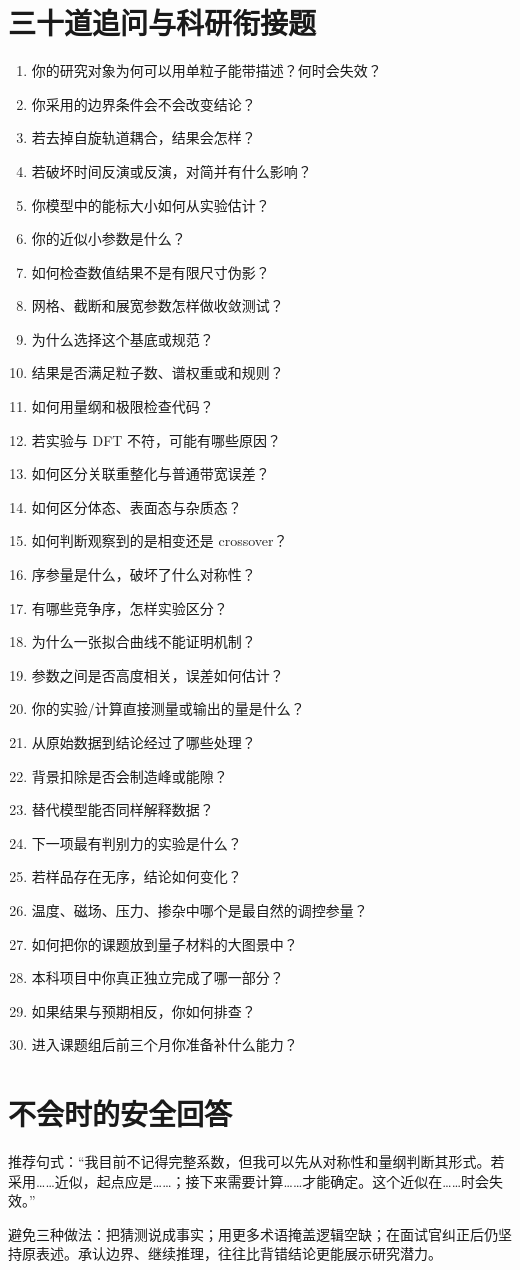 \section{三十道追问与科研衔接题}
\begin{enumerate}
\item 你的研究对象为何可以用单粒子能带描述？何时会失效？
\item 你采用的边界条件会不会改变结论？
\item 若去掉自旋轨道耦合，结果会怎样？
\item 若破坏时间反演或反演，对简并有什么影响？
\item 你模型中的能标大小如何从实验估计？
\item 你的近似小参数是什么？
\item 如何检查数值结果不是有限尺寸伪影？
\item 网格、截断和展宽参数怎样做收敛测试？
\item 为什么选择这个基底或规范？
\item 结果是否满足粒子数、谱权重或和规则？
\item 如何用量纲和极限检查代码？
\item 若实验与 DFT 不符，可能有哪些原因？
\item 如何区分关联重整化与普通带宽误差？
\item 如何区分体态、表面态与杂质态？
\item 如何判断观察到的是相变还是 crossover？
\item 序参量是什么，破坏了什么对称性？
\item 有哪些竞争序，怎样实验区分？
\item 为什么一张拟合曲线不能证明机制？
\item 参数之间是否高度相关，误差如何估计？
\item 你的实验/计算直接测量或输出的量是什么？
\item 从原始数据到结论经过了哪些处理？
\item 背景扣除是否会制造峰或能隙？
\item 替代模型能否同样解释数据？
\item 下一项最有判别力的实验是什么？
\item 若样品存在无序，结论如何变化？
\item 温度、磁场、压力、掺杂中哪个是最自然的调控参量？
\item 如何把你的课题放到量子材料的大图景中？
\item 本科项目中你真正独立完成了哪一部分？
\item 如果结果与预期相反，你如何排查？
\item 进入课题组后前三个月你准备补什么能力？
\end{enumerate}

\section{不会时的安全回答}
\begin{interviewbox}
推荐句式：“我目前不记得完整系数，但我可以先从对称性和量纲判断其形式。若采用……近似，起点应是……；接下来需要计算……才能确定。这个近似在……时会失效。”

避免三种做法：把猜测说成事实；用更多术语掩盖逻辑空缺；在面试官纠正后仍坚持原表述。承认边界、继续推理，往往比背错结论更能展示研究潜力。
\end{interviewbox}

